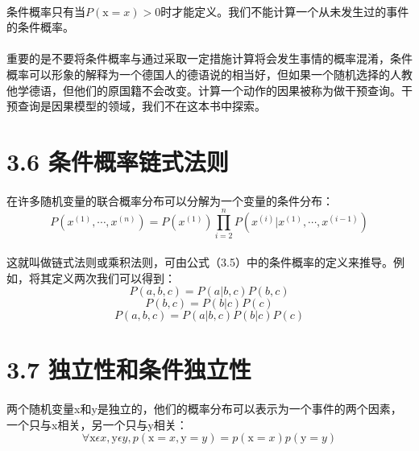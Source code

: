 \documentclass{article}
\begin{document}
    \paragraph{}
    条件概率只有当$P(\mathrm{x} = x)> 0$时才能定义。我们不能计算一个从未发生过的事件的条件概率。
    \paragraph{}
    重要的是不要将条件概率与通过采取一定措施计算将会发生事情的概率混淆，条件概率可以形象的解释为一个德国人的德语说的相当好，但如果一个随机选择的人教他学德语，但他们的原国籍不会改变。计算一个动作的因果被称为做干预查询。干预查询是因果模型的领域，我们不在这本书中探索。



 \section*{3.6 条件概率链式法则}
    \paragraph{}
    在许多随机变量的联合概率分布可以分解为一个变量的条件分布：
    \begin{equation}
      P(x^{(1)},\cdots,x^{(n)})=P(x^{(1)})\prod^{n}_{i=2} P(x^{(i)}|x^{(1)},\cdots,x^{(i-1)}) \tag{3.6}
    \end{equation}
    \paragraph{}
    这就叫做链式法则或乘积法则，可由公式（3.5）中的条件概率的定义来推导。例如，将其定义两次我们可以得到：
    $$ P (a, b, c) = P (a | b, c)P (b, c)$$
    $$ P (b, c) = P (b | c)P (c)$$
    $$ P (a, b, c) = P (a | b, c)P (b | c)P (c)$$


    \section*{3.7 独立性和条件独立性}
    \paragraph{}
    两个随机变量x和y是独立的，他们的概率分布可以表示为一个事件的两个因素，一个只与x相关，另一个只与y相关：
    \begin{equation}
      \forall \mathrm{x}\epsilon x,\mathrm{y}\epsilon y,p( \mathrm{x} = x,\mathrm{y} = y )=p( \mathrm{x} = x)p(\mathrm{y} = y )\tag{3.7}
    \end{equation}
\end{document}
